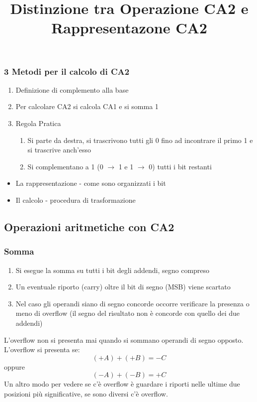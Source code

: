 \documentclass[12pt, a4paper, openany]{book}
\begin{document}
\subsubsection{3 Metodi per il calcolo di CA2}
\begin{enumerate}
    \item Definizione di complemento alla base
    \item Per calcolare CA2 si calcola CA1 e si somma 1
    \item Regola Pratica
    \begin{enumerate}
        \item Si parte da destra, si trascrivono tutti gli 0 fino ad incontrare il primo 
        1 e si trascrive anch'esso
        \item Si complementano a 1 (0 $\to$ 1 e 1 $\to$ 0) tutti i bit restanti
    \end{enumerate}
\end{enumerate}

\title{Distinzione tra Operazione CA2 e Rappresentazone CA2}
\begin{itemize}
    \item La rappresentazione - come sono organizzati i bit
    \item Il calcolo - procedura di trasformazione
\end{itemize}

\subsection{Operazioni aritmetiche con CA2}
\subsubsection{Somma}
\begin{enumerate}
    \item Si esegue la somma su tutti i bit degli addendi, segno compreso
    \item Un eventuale riporto (carry) oltre il bit di segno (MSB) viene scartato
    \item Nel caso gli operandi siano di segno concorde occorre verificare la presenza o meno
    di overflow (il segno del risultato non  è concorde con quello dei due addendi)
\end{enumerate}
L'overflow non si presenta mai quando si sommano operandi di segno opposto.
L'overflow si presenta se:
\begin{equation}
    (+A)+(+B)=-C
\end{equation}
oppure
\begin{equation}
    (-A)+(-B) = +C    
\end{equation}
Un altro modo per vedere se c'è overflow è guardare i riporti nelle ultime 
due posizioni più significative, se sono diversi c'è overflow.
\end{document}
